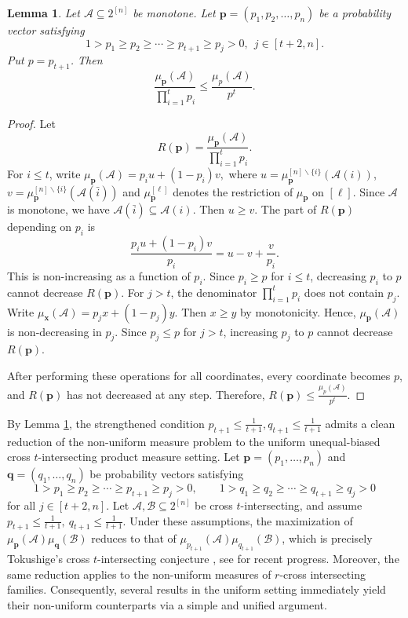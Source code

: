 \documentclass[11pt]{article}
\newtheorem{lemma}[theorem]{Lemma}
\begin{document}
\begin{lemma}\label{c42}
Let $\mathcal{A}\subseteq 2^{[n]}$ be monotone. Let $\textbf{p}=(p_1,p_2,\ldots,p_n)$ be a probability vector satisfying 
 $$1 > p_1 \ge p_2 \ge \cdots \ge p_{t+1}\geq p_j > 0,  \ \ j\in [t+2, n].$$
Put $p=p_{t+1}$. Then
$$
\frac{\mu_{\mathbf p}(\mathcal{A})}{\prod_{i=1}^t p_i}
\le
\frac{\mu_p(\mathcal{A})}{p^t}.
$$
\end{lemma}
\begin{proof}
Let
$$
R(\mathbf p)=\frac{\mu_{\mathbf p}(\mathcal{A})}{\prod_{i=1}^t p_i}.
$$
For $i\le t$,  write
$
\mu_{\mathbf p}(\mathcal{A})=p_i u+(1-p_i)v,
$
where
$
u=\mu_{\mathbf p}^{[n]\backslash \{i\}}(\mathcal{A}(i))$, $ 
v=\mu_{\mathbf p}^{[n]\backslash \{i\}}(\mathcal{A}(\bar{i})) 
$
and $\mu_{\mathbf{p}}^{[\ell]}$ denotes the restriction of $\mu_{\mathbf{p}}$ on $[\ell]$.
Since $\mathcal{A}$ is monotone, we have $\mathcal{A}(\bar{i})\subseteq \mathcal{A}(i)$. Then
$u\ge v$.
The part of $R(\mathbf p)$ depending on $p_i$ is
$$
\frac{p_i u+(1-p_i)v}{p_i}
=
u-v+\frac{v}{p_i}.
$$
This is non-increasing as a function of $p_i$. Since $p_i\ge p$ for $i\le t$, decreasing $p_i$ to $p$ cannot decrease $R(\mathbf p)$.
For $j>t$, the denominator $\prod_{i=1}^t p_i$ does not contain $p_j$. Write
$
\mu_{\mathbf x}(\mathcal{A})=p_j x+(1-p_j)y.
$
Then $x\ge y$ by monotonicity. Hence, $\mu_{\mathbf p}(\mathcal {A})$ is non-decreasing in $p_j$. Since $p_j\le p$ for $j>t$, increasing $p_j$ to $p$ cannot decrease $R(\mathbf p)$.

After performing these operations for all coordinates, every coordinate becomes $p$, and $R(\mathbf p)$ has not decreased at any step. Therefore,
$
R(\mathbf p)\le \frac{\mu_p(\mathcal{A})}{p^t}.
$
\end{proof}

By Lemma \ref{c42}, the strengthened condition
$
p_{t+1}\le \frac{1}{t+1}, q_{t+1}\le \frac{1}{t+1}
$
admits a clean reduction of the non-uniform measure problem to the uniform unequal-biased cross $t$-intersecting product measure setting.
Let $\mathbf p=(p_1,\dots,p_n)$ and $\mathbf q=(q_1,\dots,q_n)$ be probability vectors satisfying
$$
1>p_1\ge p_2\ge\cdots\ge p_{t+1}\ge p_j>0,\qquad
1>q_1\ge q_2\ge\cdots\ge q_{t+1}\ge q_j>0
$$
for all $j\in[t+2,n]$. Let $\mathcal A,\mathcal B\subseteq 2^{[n]}$ be cross $t$-intersecting, and assume
$
p_{t+1}\le \frac{1}{t+1},\ q_{t+1}\le \frac{1}{t+1}.
$
Under these assumptions, the  maximization of $\mu_{\mathbf p}(\mathcal A)\mu_{\mathbf q}(\mathcal B)$ reduces  to  
that of  $\mu_{p_{t+1}}(\mathcal A)\mu_{q_{t+1}}(\mathcal B)$, which is precisely Tokushige's cross $t$-intersecting conjecture \cite{T13}, see \cite{W25} for recent progress. Moreover, the same reduction applies to the non-uniform measures of $r$-cross intersecting families. Consequently, several results in the uniform setting immediately yield their non-uniform counterparts via a simple and unified argument.
\end{document}

